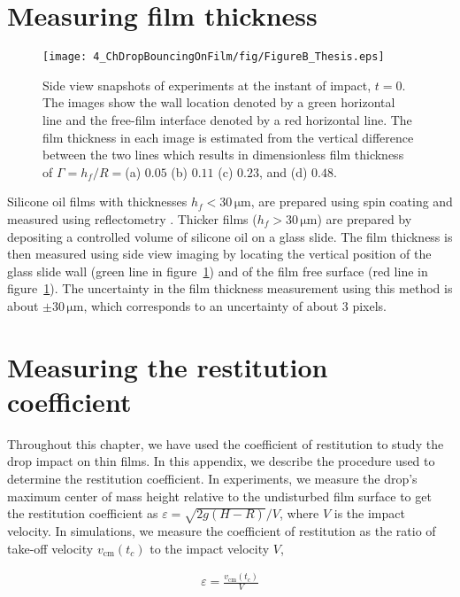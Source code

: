 \begin{subappendices}
	\section{Measuring film thickness}
	\label{sec:measuring_film_thickness}
	\begin{figure}
		\centering
		\texttt{[image: 4\_ChDropBouncingOnFilm/fig/FigureB\_Thesis.eps]}
		\caption{Side view snapshots of experiments at the instant of impact, $t = 0$. The images show the wall location denoted by a green horizontal line and the free-film interface denoted by a red horizontal line. The film thickness in each image is estimated from the vertical difference between the two lines which results in dimensionless film thickness of $\Gamma = h_{f}/R = $(a) $0.05$ (b) $0.11$ (c) $0.23$, and (d) $0.48$.}
		\label{fig:figureA2a}
	\end{figure}
	
	Silicone oil films with thicknesses $h_f < 30\,\si{\micro\meter}$, are prepared using spin coating and measured using reflectometry \citep{reizman1965optical}. 
	Thicker films ($h_f > 30\,\si{\micro\meter}$) are prepared by depositing a controlled volume of silicone oil on a glass slide. 
	The film thickness is then measured using side view imaging by locating the vertical position of the glass slide wall (green line in figure~\ref{fig:figureA2a}) and of the film free surface (red line in figure~\ref{fig:figureA2a}). 
	The uncertainty in the film thickness measurement using this method is about $\pm 30\,\si{\micro\meter}$, which corresponds to an uncertainty of about 3 pixels. 
	
	
	\section{Measuring the restitution coefficient}
	\label{sec:restitution in simulations}
	
	Throughout this chapter, we have used the coefficient of restitution to study the drop impact on thin films. In this appendix, we describe the procedure used to determine the restitution coefficient. In experiments, we measure the drop's maximum center of mass height relative to the undisturbed film surface to get the restitution coefficient as $\varepsilon = \sqrt{2g(H-R)}/V$, where $V$ is the impact velocity.  
	In simulations, we measure the coefficient of restitution as the ratio of  take-off velocity $v_{\text{cm}}(t_c)$ to the impact velocity $V$,
	
	\begin{align}
		\varepsilon = \frac{v_{\text{cm}}(t_c)}{V}
	\end{align}
	

\end{subappendices}
